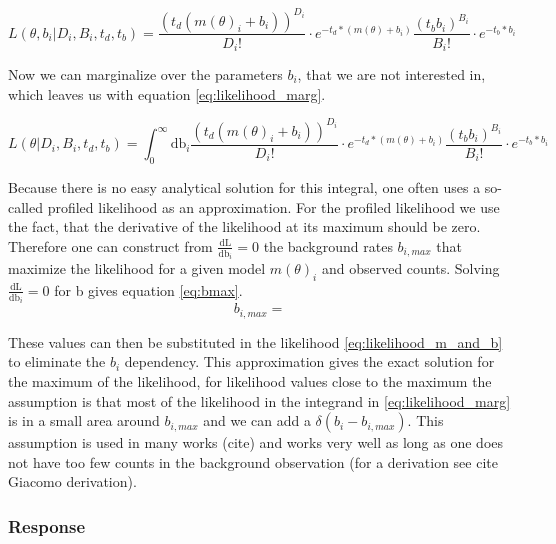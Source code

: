 \documentclass[twocolumn]{article}%
\begin{document}
\begin{equation}
	L(\theta, b_{i}|D_{i}, B_{i},t_{d},t_{b}) = \frac{(t_{d}(m(\theta)_{i}+ b_{i}))^{D_{i}}}{D_{i}!}\cdot e^{-t_{d}*(m(\theta)+b_{i})} \frac{(t_{b} b_{i})^{B_{i}}}{B_{i}!}\cdot e^{-t_{b}*b_{i}}
  \label{eq:likelihood_m_and_b}
\end{equation}

Now we can marginalize over the parameters $b_{i}$, that we are not interested in, which leaves us with equation \ref{eq:likelihood_marg}.

\begin{equation}
	L(\theta|D_{i}, B_{i},t_{d},t_{b}) = \int_{0}^{\infty}\textrm{db}_{i}\frac{(t_{d}(m(\theta)_{i}+ b_{i}))^{D_{i}}}{D_{i}!}\cdot e^{-t_{d}*(m(\theta)+b_{i})} \frac{(t_{b} b_{i})^{B_{i}}}{B_{i}!}\cdot e^{-t_{b}*b_{i}}
  \label{eq:likelihood_marg}
\end{equation}

Because there is no easy analytical solution for this integral, one often uses a so-called profiled likelihood as an approximation. For the profiled likelihood we use the fact, that the derivative of the likelihood at its maximum should be zero. Therefore one can construct from $\frac{\textrm{dL}}{\textrm{db}_i}=0$ the background rates $b_{i, max}$ that maximize the likelihood for a given model $m(\theta)_{i}$ and observed counts. Solving $\frac{\textrm{dL}}{\textrm{db}_i}=0$ for b gives equation \ref{eq:bmax}.
\begin{equation}
	b_{i,max}=
  \label{eq:bmax}
\end{equation}

These values can then be substituted in the likelihood \ref{eq:likelihood_m_and_b} to eliminate the $b_{i}$ dependency. This approximation gives the exact solution for the maximum of the likelihood, for likelihood values close to the maximum the assumption is that most of the likelihood in the integrand in \ref{eq:likelihood_marg} is in a small area around $b_{i,max}$ and we can add a $\delta(b_{i}-b_{{i,max}})$. This assumption is used in many works (cite) and works very well as long as one does not have too few counts in the background observation (for a derivation see cite Giacomo derivation).

\subsubsection*{Response}
\end{document}
